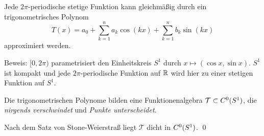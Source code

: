 \begin{frame}
    \begin{satz}
        Jede \(2\pi\)-periodische stetige Funktion kann gleichmäßig durch ein trigonometrisches Polynom 
        \[ T(x) = a_0 + \sum_{k=1}^n a_k \cos(kx) + \sum_{k=1}^n b_k \sin(kx) \]
        approximiert werden.
    \end{satz}
    \pause
    Beweis:
    \( [0,2\pi) \) parametrisiert den Einheitskreis \(S^1\) durch \( x \mapsto (\cos x, \sin x) \). 
    \pause
    \(S^1\) ist kompakt und jede \(2\pi\)-periodische Funktion auf \(\mathbb{R}\) wird hier zu einer 
    stetigen Funktion auf \(S^1\).
    \pause

    Die trigonometrischen Polynome bilden eine Funktionenalgebra \( \mathcal{T} \subset C^0(S^1) \), 
    die \textit{nirgends verschwindet} und \textit{Punkte unterscheidet}.
    \pause

    Nach dem Satz von Stone-Weierstraß liegt \( \mathcal{T} \) dicht in \( C^0(S^1) \). \qed
\end{frame}